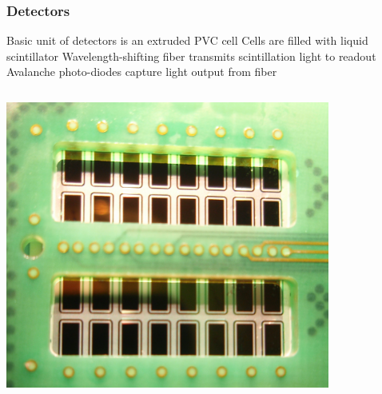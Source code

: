 \documentclass[10pt,professionalfonts,xcolor=table]{beamer}
\begin{document}
\frame
{
\frametitle{\nova Detectors}

\begin{itemize}
\bang Basic unit of \nova detectors is an extruded PVC cell
\bang Cells are filled with liquid scintillator
\bang Wavelength-shifting fiber transmits scintillation light to readout
\bang Avalanche photo-diodes capture light output from fiber
\end{itemize}

\begin{columns}[c]

\centering
 \includegraphics[width=0.8\textwidth]{figures/figures/apd_zoom.jpeg}


\end{columns}}
\end{document}
